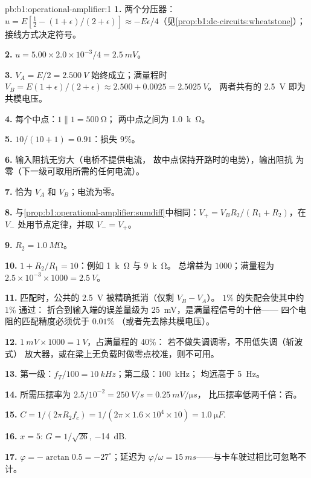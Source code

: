 \begin{solution}{pb:b1:operational-amplifier:1}
\textbf{1.} 两个分压器：$u = E[\tfrac12 - (1 + \epsilon)/(2 + \epsilon)]
\approx -E\epsilon/4$（见\cref{prop:b1:dc-circuits:wheatstone}）；
接线方式决定符号。

\textbf{2.} $u = 5.00 \times 2.0\times10^{-3}/4 = \qty{2.5}{mV}$。

\textbf{3.} $V_A = E/2 = \qty{2.500}{V}$ 始终成立；满量程时 $V_B = E(1 + \epsilon)/(2 +
\epsilon) \approx 2.500 + 0.0025 = \qty{2.5025}{V}$。
两者共有的 \qty{2.5}{V} 即为共模电压。

\textbf{4.} 每个中点：$1 \parallel 1 = \qty{500}{\ohm}$；
两中点之间为 \qty{1.0}{k\ohm}。

\textbf{5.} $10/(10 + 1) = 0.91$：损失 $9\%$。

\textbf{6.} 输入阻抗无穷大（电桥不提供电流，
故中点保持开路时的电势），输出阻抗
为零（下一级可取用所需的任何电流）。

\textbf{7.} 恰为 $V_A$ 和 $V_B$；电流为零。

\textbf{8.} 与\cref{prop:b1:operational-amplifier:sumdiff}中相同：$V_+ =
V_BR_2/(R_1 + R_2)$，在 $V_-$ 处用节点定律，并取 $V_- = V_+$。

\textbf{9.} $R_2 = \qty{1.0}{M\ohm}$。

\textbf{10.} $1 + R_2/R_1 = 10$：例如 \qty{1}{k\ohm} 与 \qty{9}{k\ohm}。
总增益为 $1000$；满量程为 $2.5 \times 10^{-3} \times 1000 = \qty{2.5}{V}$。

\textbf{11.} 匹配时，公共的 \qty{2.5}{V} 被精确抵消（仅剩 $V_B - V_A$）。
$1\%$ 的失配会使其中约 $1\%$ 通过：
折合到输入端的误差量级为 \qty{25}{mV}，是满量程信号的十倍——
四个电阻的匹配精度必须优于 $0.01\%$
（或者先去除共模电压）。

\textbf{12.} $1\ \unit{mV} \times 1000 = \qty{1}{V}$，占满量程的 40\%：
若不做失调调零，不用低失调（斩波式）
放大器，或在梁上无负载时做零点校准，则不可用。

\textbf{13.} 第一级：$f_T/100 = \qty{10}{kHz}$；第二级：\qty{100}{kHz}；
均远高于 \qty{5}{Hz}。

\textbf{14.} 所需压摆率为 $2.5/10^{-2} = \qty{250}{V/s} = \qty{0.25}{mV/\micro s}$，
比压摆率低两千倍：否。

\textbf{15.} $C = 1/(2\pi R_2f_c) = 1/(2\pi \times 1.6\times10^4 \times 10)
= \qty{1.0}{\micro F}$.

\textbf{16.} $x = 5$: $G = 1/\sqrt{26}$, \qty{-14}{dB}.

\textbf{17.} $\varphi = -\arctan 0.5 = -27^\circ$；延迟为 $\varphi/\omega =
\qty{15}{ms}$——与卡车驶过相比可忽略不计。


\end{solution}
